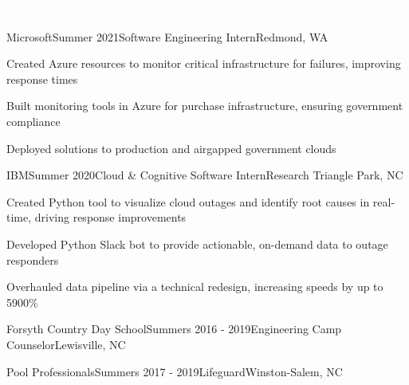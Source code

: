 \documentclass{resume}
\begin{document}
\begin{rSection}{\colorbox{NCSURED}{\textcolor{WHITE}{Experience}}}
	\begin{rSubsection}{Microsoft}{Summer 2021}{Software Engineering Intern}{Redmond, WA}
		\item
			Created Azure resources to monitor critical infrastructure for failures, improving response times
		\item
			Built monitoring tools in Azure for purchase infrastructure, ensuring government compliance
		\item
			Deployed solutions to production and airgapped government clouds
	\end{rSubsection}
	
	\begin{rSubsection}{IBM}{Summer 2020}{Cloud \& Cognitive Software Intern}{Research Triangle Park, NC}
		\item
			Created Python tool to visualize cloud outages and identify root causes in real-time, driving response improvements
		\item
			Developed Python Slack bot to provide actionable, on-demand data to outage responders
		\item
			Overhauled data pipeline via a technical redesign, increasing speeds by up to 5900\%
	\end{rSubsection}

	\begin{rSubsectionEmpty}{Forsyth Country Day School}{Summers 2016 - 2019}{Engineering Camp Counselor}{Lewisville, NC}
	\end{rSubsectionEmpty}

	\begin{rSubsectionEmpty}{Pool Professionals}{Summers 2017 - 2019}{Lifeguard}{Winston-Salem, NC}
	\end{rSubsectionEmpty}	
\end{rSection}
\end{document}
